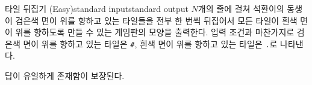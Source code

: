 \begin{problem}{타일 뒤집기 (Easy)}{standard input}{standard output}
\OutputFile
$N$개의 줄에 걸쳐 석환이의 동생이 검은색 면이 위를 향하고 있는 타일들을 전부 한 번씩 뒤집어서 모든 타일이 흰색 면이 위를 향하도록 만들 수 있는 게임판의 모양을 출력한다. 입력 조건과 마찬가지로 검은색 면이 위를 향하고 있는 타일은 \texttt{\#}, 흰색 면이 위를 향하고 있는 타일은 \texttt{.}로 나타낸다.

답이 유일하게 존재함이 보장된다.

\Example

\begin{example}
%
%
\end{example}

\end{problem}
